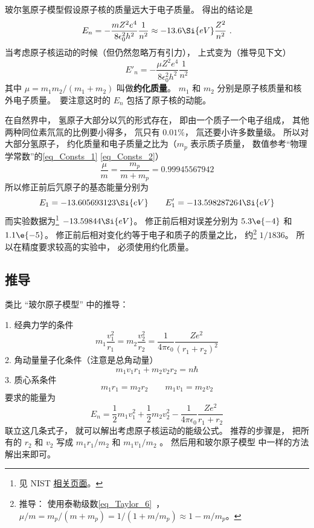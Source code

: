 
玻尔氢原子模型假设原子核的质量远大于电子质量。 得出的结论是
\begin{equation}
E_n = -\frac{mZ^2 e^4}{8\epsilon_0^2 h^2}\frac{1}{n^2} \approx  - 13.6\Si{eV} \frac{Z^2}{n^2}~.
\end{equation}
当考虑原子核运动的时候（但仍然忽略万有引力）， 上式变为（推导见下文）
\begin{equation}\label{eq_HRMass_1}
E'_n = -\frac{\mu Z^2 e^4}{8\epsilon_0^2 h^2} \frac{1}{n^2}
\end{equation}
其中 $\mu  = m_1 m_2/(m_1 + m_2)$ 叫做\textbf{约化质量}。 $m_1$ 和 $m_2$ 分别是原子核质量和核外电子质量。　要注意这时的 $E_n$ 包括了原子核的动能。

在自然界中， 氢原子大部分以氕的形式存在， 即由一个质子一个电子组成， 其他两种同位素氘氚的比例要小得多， 氘只有 $0.01\%$， 氚还要小许多数量级。 所以对大部分氢原子， 约化质量和电子质量之比为（$m_p$ 表示质子质量， 数值参考“物理学常数”的\autoref{eq_Consts_1} \autoref{eq_Consts_2}）
\begin{equation}
\frac{\mu}{m} = \frac{m_p}{m + m_p} = 0.99945567942
\end{equation}
所以修正前后氕原子的基态能量分别为
\begin{equation}
E_1 = -13.605693123\Si{eV} \qquad 
E'_1 = -13.598287264\Si{eV}
\end{equation}
而实验数据为\footnote{见 NIST \href{https://webbook.nist.gov/cgi/cbook.cgi?ID=C12385136&Mask=20}{相关页面}。} $-13.59844\Si{eV}$。 修正前后相对误差分别为 $5.3\e{-4}$ 和 $1.1\e{-5}$。 修正前后相对变化约等于电子和质子的质量之比， 约\footnote{推导： 使用泰勒级数\autoref{eq_Taylor_6}~， $\mu/m = m_p/(m + m_p) = 1/(1 + m/m_p) \approx 1 - m/m_p$。} $1/1836$。 所以在精度要求较高的实验中， 必须使用约化质量。

\subsection{推导}
类比 “玻尔原子模型” 中的推导：

1. 经典力学的条件
\begin{equation}
m_1 \frac{v_1^2}{r_1} = m_2 \frac{v_2^2}{r_2} = \frac{1}{4\pi\epsilon_0} \frac{Z e^2}{(r_1 + r_2)^2}
\end{equation}
2. 角动量量子化条件（注意是总角动量）
\begin{equation}
m_1 v_1 r_1 + m_2 v_2 r_2 = n\hbar 
\end{equation}
3. 质心系条件
\begin{equation}
m_1 r_1 = m_2 r_2 \qquad m_1 v_1 = m_2 v_2
\end{equation}
要求的能量为
\begin{equation}
E_n = \frac12 m_1 v_1^2 + \frac12 m_2 v_2^2 - \frac{1}{4\pi\epsilon_0} \frac{Z e^2}{r_1 + r_2}
\end{equation}
联立这几条式子， 就可以解出考虑原子核运动的能级公式。 推荐的步骤是， 把所有的 $r_2$ 和 $v_2$ 写成 $m_1 r_1/m_2$ 和 $m_1 v_1/m_2$ 。 然后用和玻尔原子模型%
中一样的方法解出来即可。
